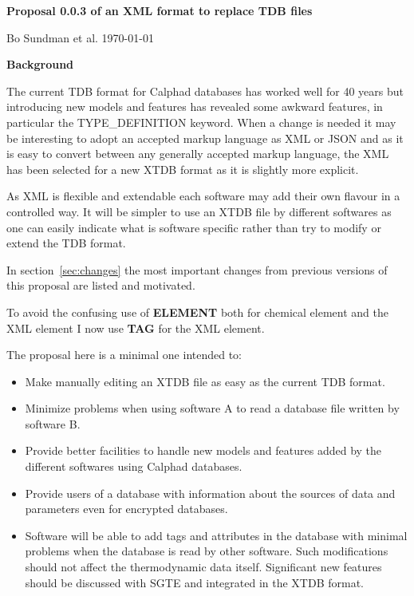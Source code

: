 \documentclass{article}
\begin{document}
\begin{center}

  {\Large \bf Proposal 0.0.3 of an XML format to replace TDB files}

  Bo Sundman et al. \today

  \vspace{5mm}

  {\large \bf Background}

\end{center}

\bigskip

The current TDB format for Calphad databases has worked well for 40
years but introducing new models and features has revealed some
awkward features, in particular the TYPE\_DEFINITION keyword.  When a
change is needed it may be interesting to adopt an accepted markup
language as XML or JSON and as it is easy to convert between any
generally accepted markup language, the XML has been selected for a
new XTDB format as it is slightly more explicit.

As XML is flexible and extendable each software may add their own
flavour in a controlled way.  It will be simpler to use an XTDB file
by different softwares as one can easily indicate what is software
specific rather than try to modify or extend the TDB format.

In section~\ref{sec:changes} the most important changes from previous
versions of this proposal are listed and motivated.

To avoid the confusing use of {\bf ELEMENT} both for chemical element
and the XML element I now use {\bf TAG} for the XML element.

The proposal here is a minimal one intended to:
\begin{itemize}
  \item Make manually editing an XTDB file as easy as the current TDB
    format.
  \item Minimize problems when using software A to read a database
    file written by software B.
  \item Provide better facilities to handle new models and features
    added by the different softwares using Calphad databases.
  \item Provide users of a database with information about the sources
    of data and parameters even for encrypted databases.
  \item Software will be able to add tags and attributes in the
    database with minimal problems when the database is read by other
    software.  Such modifications should not affect the thermodynamic
    data itself.  Significant new features should be discussed with
    SGTE and integrated in the XTDB format.
\end{itemize}
\end{document}
